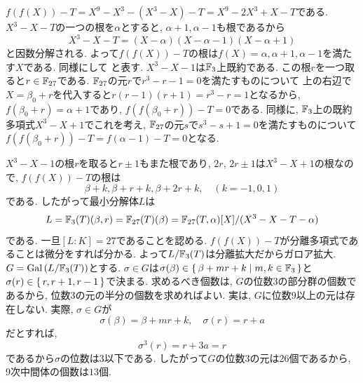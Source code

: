 \begin{egans}
$f(f(X)) - T = X^9-X^3 - (X^3-X) - T = X^9 - 2X^3 + X - T$である. $X^3 - X - T $の一つの根を$\alpha$とすると, $\alpha+1, \alpha-1$も根であるから
\[X^3 - X - T = (X-\alpha)(X-\alpha-1)(X-\alpha+1)\]
と因数分解される. よって$f(f(X)) - T$の根は$f(X) = \alpha, \alpha+1,\alpha-1$を満たす$X$である. 同様にして
と表す. $X^3 - X - 1$は$\mathbb{F}_{3}$上既約である. この根$r$を一つ取ると$r\in \mathbb{F}_{27}$である. $\mathbb{F}_{27}$の元$r$で$r^3 - r - 1 = 0$を満たすものについて   上の右辺で$X=\beta_0 + r$を代入すると$r(r-1)(r+1) = r^3 - r = 1$となるから, $f(\beta_0 + r) = \alpha + 1$であり, $f(f(\beta_0 + r)) - T=0$である. 同様に, $\mathbb{F}_{3}$上の既約多項式$X^3 - X + 1$でこれを考え, $\mathbb{F}_{27}$の元$s$で$s^3 - s + 1 = 0$を満たすものについて$f(f(\beta_0 + r)) - T = f(\alpha - 1) - T = 0$となる. \par
$X^3-X-1$の根$r$を取ると$r\pm 1$もまた根であり, $2r$, $2r\pm 1$は$X^3 - X + 1$の根なので, $f(f(X)) - T$の根は
\[\beta + k, \beta + r + k , \beta + 2r + k,\quad (k=-1,0,1)\]
である. したがって最小分解体$L$は
\[L = \mathbb{F}_{3}(T)(\beta, r) = \mathbb{F}_{27}(T)(\beta) = \mathbb{F}_{27}(T,\alpha)[X]/(X^3-X-T-\alpha)\]
である. 一旦$[L:K] = 27$であることを認める. $f(f(X)) - T$が分離多項式であることは微分をすれば分かる. よって$L/\mathbb{F}_3(T)$は分離拡大だからガロア拡大. $G = \operatorname{Gal}{(L/\mathbb{F}_{3}(T))}$とする. $\sigma\in G$は$\sigma(\beta)\in \set{\beta + mr + k \mid m,k\in \mathbb{F}_{3}}$と$\sigma(r) \in \set{r,r+1,r-1}$で決まる. 求めるべき個数は, $G$の位数3の部分群の個数であるから, 位数3の元の半分の個数を求めればよい. 実は, $G$に位数9以上の元は存在しない. 実際, $\sigma\in G$が
\[\sigma(\beta) = \beta + m r + k,\quad \sigma(r) = r+a\]
だとすれば,
\[\sigma^3(r) = r+3a = r\]
であるから$\sigma$の位数は3以下である. したがって$G$の位数3の元は26個であるから, 9次中間体の個数は$13$個. \\

\end{egans}








